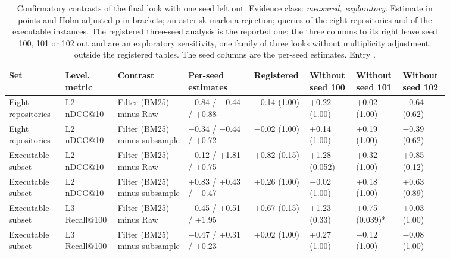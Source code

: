 \begin{table}[t]
\centering\small
\caption{Confirmatory contrasts of the final look with one seed left out. Evidence class: \emph{measured, exploratory}. Estimate in points and Holm-adjusted p in brackets; an asterisk marks a rejection; queries of the eight repositories and of the executable instances. The registered three-seed analysis is the reported one; the three columns to its right leave seed 100, 101 or 102 out and are an exploratory sensitivity, one family of three looks without multiplicity adjustment, outside the registered tables. The seed columns are the per-seed estimates. Entry .}
\label{tab:rq2_final_leave_seed}
\begin{tabular}{>{\raggedright\arraybackslash}p{0.12\linewidth}>{\raggedright\arraybackslash}p{0.09\linewidth}>{\raggedright\arraybackslash}p{0.15\linewidth}>{\raggedright\arraybackslash}p{0.14\linewidth}>{\raggedleft\arraybackslash}p{0.09\linewidth}>{\raggedleft\arraybackslash}p{0.09\linewidth}>{\raggedleft\arraybackslash}p{0.09\linewidth}>{\raggedleft\arraybackslash}p{0.09\linewidth}}
\toprule
Set & Level, metric & Contrast & Per-seed estimates & Registered & Without seed 100 & Without seed 101 & Without seed 102 \\
\midrule
Eight repositories & L2 nDCG@10 & Filter (BM25) minus Raw & $-$0.84 / $-$0.44 / +0.88 & $-$0.14 (1.00) & +0.22 (1.00) & +0.02 (1.00) & $-$0.64 (0.62) \\
Eight repositories & L2 nDCG@10 & Filter (BM25) minus subsample & $-$0.34 / $-$0.44 / +0.72 & $-$0.02 (1.00) & +0.14 (1.00) & +0.19 (1.00) & $-$0.39 (0.62) \\
Executable subset & L2 nDCG@10 & Filter (BM25) minus Raw & $-$0.12 / +1.81 / +0.75 & +0.82 (0.15) & +1.28 (0.052) & +0.32 (1.00) & +0.85 (0.12) \\
Executable subset & L2 nDCG@10 & Filter (BM25) minus subsample & +0.83 / +0.43 / $-$0.47 & +0.26 (1.00) & $-$0.02 (1.00) & +0.18 (1.00) & +0.63 (0.89) \\
Executable subset & L3 Recall@100 & Filter (BM25) minus Raw & $-$0.45 / +0.51 / +1.95 & +0.67 (0.15) & +1.23 (0.33) & +0.75 (0.039)* & +0.03 (1.00) \\
Executable subset & L3 Recall@100 & Filter (BM25) minus subsample & $-$0.47 / +0.31 / +0.23 & +0.02 (1.00) & +0.27 (1.00) & $-$0.12 (1.00) & $-$0.08 (1.00) \\
\bottomrule
\end{tabular}
\end{table}
